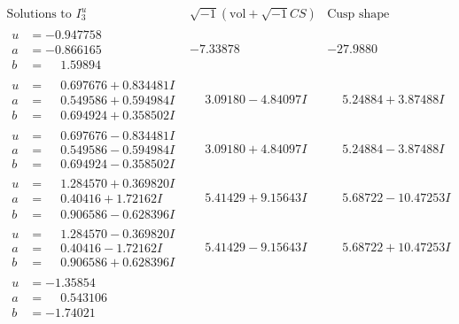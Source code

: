 \documentclass[1p]{elsarticle_modified}
\theoremstyle{definition}
\newcommand{\I}{\sqrt{-1}}
\begin{document}
$$\begin{array}{c|c|c}  
\text{Solutions to }I^u_{3}& \I (\text{vol} + \sqrt{-1}CS) & \text{Cusp shape}\\
 \hline 
\begin{aligned}
u &= -0.947758\phantom{ +0.000000I} \\
a &= -0.866165\phantom{ +0.000000I} \\
b &= \phantom{-}1.59894\phantom{ +0.000000I}\end{aligned}
 & -7.33878\phantom{ +0.000000I} & -27.9880\phantom{ +0.000000I} \\ \hline\begin{aligned}
u &= \phantom{-}0.697676 + 0.834481 I \\
a &= \phantom{-}0.549586 + 0.594984 I \\
b &= \phantom{-}0.694924 + 0.358502 I\end{aligned}
 & \phantom{-}3.09180 - 4.84097 I & \phantom{-}5.24884 + 3.87488 I \\ \hline\begin{aligned}
u &= \phantom{-}0.697676 - 0.834481 I \\
a &= \phantom{-}0.549586 - 0.594984 I \\
b &= \phantom{-}0.694924 - 0.358502 I\end{aligned}
 & \phantom{-}3.09180 + 4.84097 I & \phantom{-}5.24884 - 3.87488 I \\ \hline\begin{aligned}
u &= \phantom{-}1.284570 + 0.369820 I \\
a &= \phantom{-}0.40416 + 1.72162 I \\
b &= \phantom{-}0.906586 - 0.628396 I\end{aligned}
 & \phantom{-}5.41429 + 9.15643 I & \phantom{-}5.68722 - 10.47253 I \\ \hline\begin{aligned}
u &= \phantom{-}1.284570 - 0.369820 I \\
a &= \phantom{-}0.40416 - 1.72162 I \\
b &= \phantom{-}0.906586 + 0.628396 I\end{aligned}
 & \phantom{-}5.41429 - 9.15643 I & \phantom{-}5.68722 + 10.47253 I \\ \hline\begin{aligned}
u &= -1.35854\phantom{ +0.000000I} \\
a &= \phantom{-}0.543106\phantom{ +0.000000I} \\
b &= -1.74021\phantom{ +0.000000I}\end{aligned}

\end{array}$$
\end{document}
